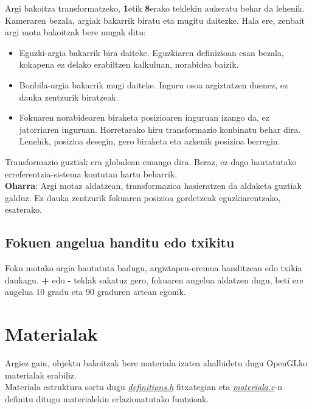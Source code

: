 \documentclass[12pt]{article}
\newcommand{\fitxategi}[1] {\underline{\textit{#1}}}
\newcommand{\tekla}[1] {\textbf{#1}}
\begin{document}
Argi bakoitza transformatzeko, \tekla{1}etik \tekla{8}erako teklekin aukeratu behar da lehenik. Kameraren bezala, argiak bakarrik biratu eta mugitu daitezke. Hala ere, zenbait argi mota bakoitzak bere mugak ditu:

\begin{itemize}
\item Eguzki-argia bakarrik bira daiteke. Eguzkiaren definizioan esan bezala, kokapena ez delako erabiltzen kalkuluan, norabidea baizik.

\item Bonbila-argia bakarrik mugi daiteke. Inguru osoa argiztatzen duenez, ez dauka zentzurik biratzeak.

\item Fokuaren norabidearen biraketa posizioaren inguruan izango da, ez jatorriaren inguruan. Horretarako hiru transformazio konbinatu behar dira. Lenehik, posizioa desegin, gero biraketa eta azkenik posizioa berregin.

\end{itemize}

Transformazio guztiak era globalean emango dira. Beraz, ez dago hautatutako erreferentzia-sistema kontutan hartu beharrik.\\

\textbf{Oharra}: Argi motaz aldatzean, transformazioa hasieratzen da aldaketa guztiak galduz. Ez dauka zentzurik fokuaren posizioa gordetzeak eguzkiarentzako, esaterako.

\subsection{Fokuen angelua handitu edo txikitu}

Foku motako argia hautatuta badugu, argiztapen-eremua handitzean edo txikia daukagu. \tekla{+} edo \tekla{-} teklak sakatuz gero, fokuaren angelua aldatzen dugu, beti ere angelua 10 gradu eta 90 graduren artean egonik.

\section{Materialak}

Argiez gain, objektu bakoitzak bere materiala izatea ahalbidetu dugu OpenGLko materialak erabiliz.\\

Materiala estruktura sortu dugu \fitxategi{definitions.h} fitxategian eta \fitxategi{materiala.c}-n definitu ditugu materialekin erlazionatutako funtzioak.\\
\end{document}
